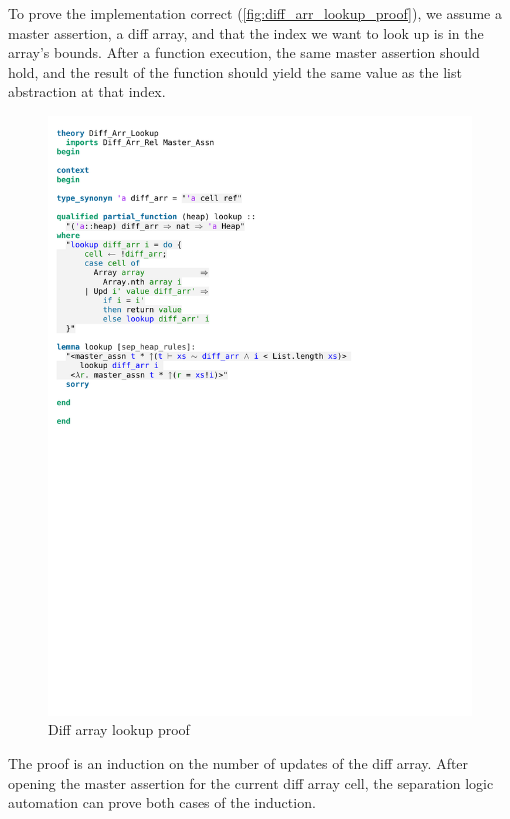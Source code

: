 \noindent To prove the implementation correct (\autoref{fig:diff_arr_lookup_proof}), we assume a master assertion, a diff array, and that the index we want to look up is in the array's bounds. After a function execution, the same master assertion should hold, and the result of the function should yield the same value as the list abstraction at that index.

\begin{figure}[htpb]
    \includegraphics[trim={0 16,6cm 0 11,2cm}, clip, width=1.00\textwidth]{figures/Theory_Diff_Arr_Lookup.pdf}
    \caption[Diff array lookup proof]{Diff array lookup proof}
    \label{fig:diff_arr_lookup_proof}
\end{figure}

\noindent The proof is an induction on the number of updates of the diff array. After opening the master assertion for the current diff array cell, the separation logic automation can prove both cases of the induction.

